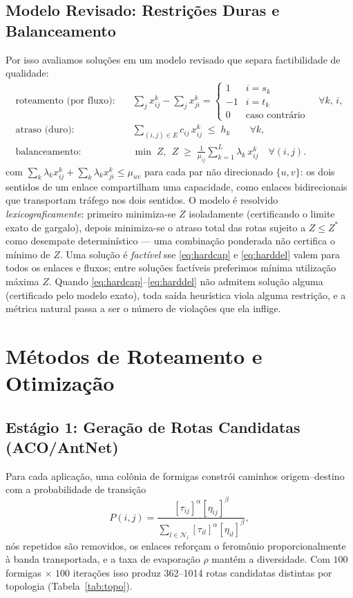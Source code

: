 \documentclass[journal]{IEEEtran}
\begin{document}
\subsection{Modelo Revisado: Restrições Duras e Balanceamento}
\label{sec:revfo}
Por isso avaliamos soluções em um modelo revisado que separa factibilidade
de qualidade:
\begin{align}
\text{roteamento (por fluxo):}\quad
&\sum_{j} x_{ij}^{k}-\sum_{j} x_{ji}^{k} =
\begin{cases} 1 & i=s_k\\ -1 & i=t_k\\ 0 & \text{caso contrário}\end{cases}
\quad \forall k,\, i, \label{eq:flowcons}\\
\text{atraso (duro):}\quad
&\sum_{(i,j)\in E} c_{ij}\,x_{ij}^{k} \;\le\; h_k
\qquad \forall k, \label{eq:harddel}\\
\text{balanceamento:}\quad
&\min\; Z,\ \ Z \;\ge\;
\frac{1}{\mu_{ij}}\sum_{k=1}^{L}\lambda_k\,x_{ij}^{k}
\quad \forall (i,j). \label{eq:minmax}
\end{align}
com $\sum_k \lambda_k x_{ij}^k + \sum_k \lambda_k x_{ji}^k \le \mu_{uv}$
para cada par não direcionado $\{u,v\}$: os dois sentidos de um enlace
compartilham uma capacidade, como enlaces bidirecionais que transportam
tráfego nos dois sentidos. O modelo é resolvido \emph{lexicograficamente}:
primeiro minimiza-se $Z$ isoladamente (certificando o limite exato de
gargalo), depois minimiza-se o atraso total das rotas sujeito a
$Z \le Z^{*}$ como desempate determinístico --- uma combinação ponderada
não certifica o mínimo de $Z$.
Uma solução é \emph{factível} sse \eqref{eq:hardcap} e \eqref{eq:harddel}
valem para todos os enlaces e fluxos; entre soluções factíveis preferimos
mínima utilização máxima $Z$. Quando \eqref{eq:hardcap}--\eqref{eq:harddel}
não admitem solução alguma (certificado pelo modelo exato), toda saída
heurística viola alguma restrição, e a métrica natural passa a ser o número
de violações que ela inflige.

\section{Métodos de Roteamento e Otimização}
\label{sec:method}

\subsection{Estágio 1: Geração de Rotas Candidatas (ACO/AntNet)}
Para cada aplicação, uma colônia de formigas constrói caminhos
origem--destino com a probabilidade de transição
\begin{equation}
P(i,j)=\frac{[\tau_{ij}]^{\alpha}[\eta_{ij}]^{\beta}}
{\sum_{l\in\mathcal{N}_i}[\tau_{il}]^{\alpha}[\eta_{il}]^{\beta}},
\label{eq:aco}
\end{equation}
nós repetidos são removidos, os enlaces reforçam o feromônio
proporcionalmente à banda transportada, e a taxa de evaporação $\rho$
mantém a diversidade. Com $100$ formigas $\times$ $100$ iterações isso
produz 362--1014 rotas candidatas distintas por topologia
(Tabela~\ref{tab:topo}).
\end{document}
